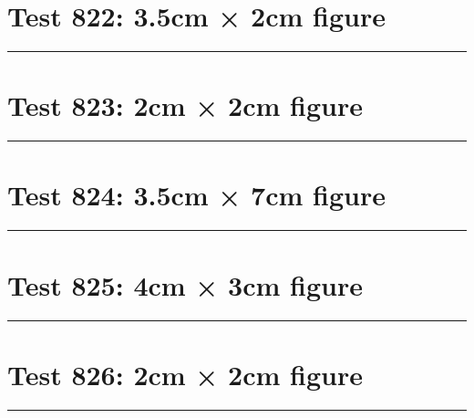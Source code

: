 \documentclass[a4paper,11pt]{article}
\begin{document}
\section*{Test 822: 3.5cm × 2cm figure}
\begin{swarmwrap}%
  \begin{minipage}[t]{3cm}
    \centering
    \rule{\linewidth}{2cm}
  \end{minipage}%
\end{swarmwrap}%
\swarmwrapnext
\lipsum[73]
\lipsum[74]
\lipsum[75]
\lipsum[76]
\section*{Test 823: 2cm × 2cm figure}
\begin{swarmwrap}%
  \begin{minipage}[t]{2cm}
    \centering
    \rule{\linewidth}{2cm}
  \end{minipage}%
\end{swarmwrap}%
\swarmwrapnext
\lipsum[135]
\lipsum[136]
\lipsum[137]
\lipsum[138]
\section*{Test 824: 3.5cm × 7cm figure}
\begin{swarmwrap}%
  \begin{minipage}[t]{3cm}
    \centering
    \rule{\linewidth}{7cm}
  \end{minipage}%
\end{swarmwrap}%
\swarmwrapnext
\lipsum[23]
\lipsum[24]
\lipsum[25]
\lipsum[26]
\lipsum[27]
\lipsum[28]
\section*{Test 825: 4cm × 3cm figure}
\begin{swarmwrap}%
  \begin{minipage}[t]{4cm}
    \centering
    \rule{\linewidth}{3cm}
  \end{minipage}%
\end{swarmwrap}%
\swarmwrapnext
\lipsum[102]
\lipsum[103]
\lipsum[104]
\lipsum[105]
\section*{Test 826: 2cm × 2cm figure}
\begin{swarmwrap}%
  \begin{minipage}[t]{2cm}
    \centering
    \rule{\linewidth}{2cm}
  \end{minipage}%
\end{swarmwrap}%
\swarmwrapnext
\lipsum[35]
\lipsum[36]
\lipsum[37]
\lipsum[38]
\lipsum[39]
\lipsum[40]
\end{document}
